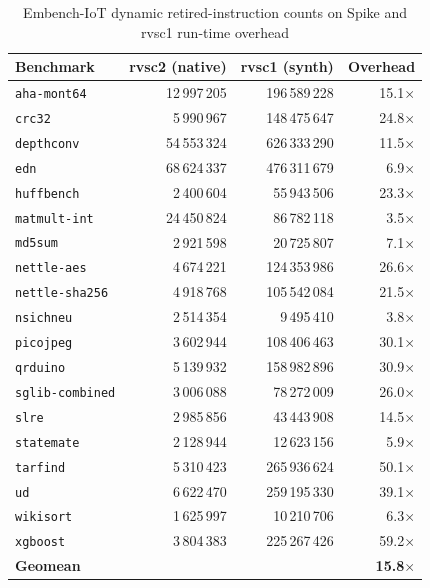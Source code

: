 \begin{table}[htb]
\centering
\caption{Embench-IoT dynamic retired-instruction counts on Spike and rvsc1 run-time overhead}
\label{tab:embench-perf}
\begin{tabular}{lrrr}
\toprule
\textbf{Benchmark} & \textbf{rvsc2 (native)} & \textbf{rvsc1 (synth)} & \textbf{Overhead} \\
\midrule
\texttt{aha-mont64}     & 12\,997\,205 & 196\,589\,228 & 15.1$\times$ \\
\texttt{crc32}          &  5\,990\,967 & 148\,475\,647 & 24.8$\times$ \\
\texttt{depthconv}      & 54\,553\,324 & 626\,333\,290 & 11.5$\times$ \\
\texttt{edn}            & 68\,624\,337 & 476\,311\,679 &  6.9$\times$ \\
\texttt{huffbench}      &  2\,400\,604 &  55\,943\,506 & 23.3$\times$ \\
\texttt{matmult-int}    & 24\,450\,824 &  86\,782\,118 &  3.5$\times$ \\
\texttt{md5sum}         &  2\,921\,598 &  20\,725\,807 &  7.1$\times$ \\
\texttt{nettle-aes}     &  4\,674\,221 & 124\,353\,986 & 26.6$\times$ \\
\texttt{nettle-sha256}  &  4\,918\,768 & 105\,542\,084 & 21.5$\times$ \\
\texttt{nsichneu}       &  2\,514\,354 &   9\,495\,410 &  3.8$\times$ \\
\texttt{picojpeg}       &  3\,602\,944 & 108\,406\,463 & 30.1$\times$ \\
\texttt{qrduino}        &  5\,139\,932 & 158\,982\,896 & 30.9$\times$ \\
\texttt{sglib-combined} &  3\,006\,088 &  78\,272\,009 & 26.0$\times$ \\
\texttt{slre}           &  2\,985\,856 &  43\,443\,908 & 14.5$\times$ \\
\texttt{statemate}      &  2\,128\,944 &  12\,623\,156 &  5.9$\times$ \\
\texttt{tarfind}        &  5\,310\,423 & 265\,936\,624 & 50.1$\times$ \\
\texttt{ud}             &  6\,622\,470 & 259\,195\,330 & 39.1$\times$ \\
\texttt{wikisort}       &  1\,625\,997 &  10\,210\,706 &  6.3$\times$ \\
\texttt{xgboost}        &  3\,804\,383 & 225\,267\,426 & 59.2$\times$ \\
\midrule
\textbf{Geomean}        &              &               & \textbf{15.8$\times$} \\
\bottomrule
\end{tabular}
\end{table}

